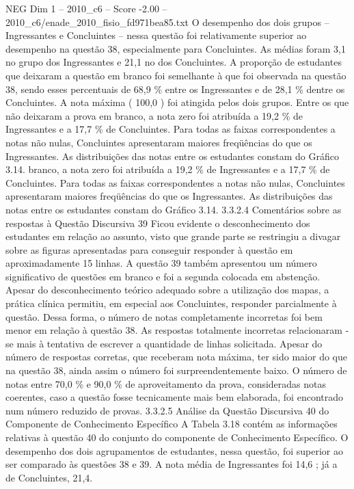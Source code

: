 \begin{textsample}{NEG Dim 1 – 2010\_c6 – Score -2.00 – 2010\_c6/enade\_2010\_fisio\_fd971bea85.txt}
O desempenho dos dois grupos – Ingressantes e Concluintes – nessa questão foi relativamente superior ao desempenho na questão 38, especialmente para Concluintes.
As médias foram 3,1 no grupo dos Ingressantes e 21,1 no dos Concluintes.
A proporção de estudantes que deixaram a questão em branco foi semelhante à que foi observada na questão 38, sendo esses percentuais de 68,9 \% entre os Ingressantes e de 28,1 \% dentre os Concluintes.
A nota máxima ( 100,0 ) foi atingida pelos dois grupos.
Entre os que não deixaram a prova em branco, a nota zero foi atribuída a 19,2 \% de Ingressantes e a 17,7 \% de Concluintes.
Para todas as faixas correspondentes a notas não nulas, Concluintes apresentaram maiores freqüências do que os Ingressantes.
As distribuições das notas entre os estudantes constam do Gráfico 3.14. branco, a nota zero foi atribuída a 19,2 \% de Ingressantes e a 17,7 \% de Concluintes.
Para todas as faixas correspondentes a notas não nulas, Concluintes apresentaram maiores freqüências do que os Ingressantes.
As distribuições das notas entre os estudantes constam do Gráfico 3.14. 3.3.2.4 Comentários sobre as respostas à Questão Discursiva 39 Ficou evidente o desconhecimento dos estudantes em relação ao assunto, visto que grande parte se restringiu a divagar sobre as figuras apresentadas para conseguir responder à questão em aproximadamente 15 linhas.
A questão 39 também apresentou um número significativo de questões em branco e foi a segunda colocada em abstenção.
Apesar do desconhecimento teórico adequado sobre a utilização dos mapas, a prática clínica permitiu, em especial aos Concluintes, responder parcialmente à questão.
Dessa forma, o número de notas completamente incorretas foi bem menor em relação à questão 38.
As respostas totalmente incorretas relacionaram -se mais à tentativa de escrever a quantidade de linhas solicitada.
Apesar do número de respostas corretas, que receberam nota máxima, ter sido maior do que na questão 38, ainda assim o número foi surpreendentemente baixo.
O número de notas entre 70,0 \% e 90,0 \% de aproveitamento da prova, consideradas notas coerentes, caso a questão fosse tecnicamente mais bem elaborada, foi encontrado num número reduzido de provas. 3.3.2.5 Análise da Questão Discursiva 40 do Componente de Conhecimento Específico A Tabela 3.18 contém as informações relativas à questão 40 do conjunto do componente de Conhecimento Específico.
O desempenho dos dois agrupamentos de estudantes, nessa questão, foi superior ao ser comparado às questões 38 e 39.
A nota média de Ingressantes foi 14,6 ; já a de Concluintes, 21,4.

\end{textsample}
